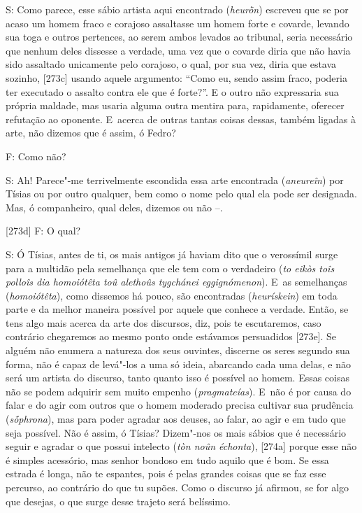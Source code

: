  

S: Como parece, esse sábio artista aqui encontrado (\emph{heurṑn})
escreveu que se por acaso um homem fraco e corajoso assaltasse um
homem forte e covarde, levando sua toga e outros pertences, ao serem
ambos levados ao tribunal, seria necessário que nenhum deles dissesse a
verdade, uma vez que o covarde diria que não havia sido assaltado
unicamente pelo corajoso, o qual, por sua vez, diria que estava sozinho,
[273c] usando aquele argumento: ``Como eu, sendo assim fraco,
poderia ter executado o assalto contra ele que é forte?''. E o outro não
expressaria sua própria maldade, mas usaria alguma outra mentira para,
rapidamente, oferecer refutação ao oponente. E~acerca de outras tantas
coisas dessas, também ligadas à arte, não dizemos que é assim, ó Fedro?

 

F: Como não?

 

S: Ah! Parece"-me terrivelmente escondida essa arte encontrada
(\emph{aneureîn}) por Tísias ou por outro qualquer, bem como o nome pelo
qual ela pode ser designada. Mas, ó companheiro, qual deles, dizemos ou
não --.

 

[273d] F: O qual?

 

S: Ó Tísias, antes de ti, os mais antigos já haviam dito que o
verossímil surge para a multidão pela semelhança que ele tem com o
verdadeiro (\emph{to eikòs toîs polloîs dia homoiótêta toû alethoûs
tygchánei eggignómenon}). E~as semelhanças (\emph{homoiótêta}), como
dissemos há pouco, são encontradas (\emph{heurískein}) em toda parte e
da melhor maneira possível por aquele que conhece a verdade. Então, se
tens algo mais acerca da arte dos discursos, diz, pois te escutaremos,
caso contrário chegaremos ao mesmo ponto onde estávamos persuadidos
[273e]. Se alguém não enumera a natureza dos seus ouvintes, discerne
os seres segundo sua forma, não é capaz de levá"-los a uma só ideia,
abarcando cada uma delas, e não será um artista do discurso, tanto
quanto isso é possível ao homem. Essas coisas não se podem adquirir sem
muito empenho (\emph{pragmateías}). E~não é por causa do falar e do agir
com outros que o homem moderado precisa cultivar sua prudência
(\emph{sṓphrona}), mas para poder agradar aos deuses, ao falar, ao agir
e em tudo que seja possível. Não é assim, ó Tísias? Dizem"-nos os mais
sábios que é necessário seguir e agradar o que possui intelecto
(\emph{tòn noûn échonta}), [274a] porque esse não é simples
acessório, mas senhor bondoso em tudo aquilo que é bom. Se essa estrada
é longa, não te espantes, pois é pelas grandes coisas que se faz esse
percurso, ao contrário do que tu supões. Como o discurso já afirmou, se
for algo que desejas, o que surge desse trajeto será belíssimo.

